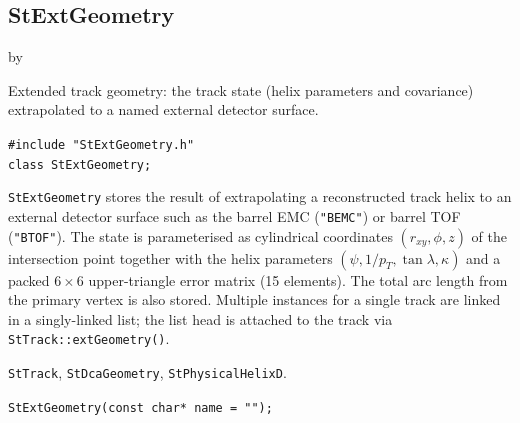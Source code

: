 \documentclass[twoside]{article}
\newcommand{\entrylabel}[1]{\mbox{\textbf{{#1}}}\hfil}%
\newenvironment{entry}
{\begin{list}{}%
    {\renewcommand{\makelabel}{\entrylabel}%
     \setlength{\labelwidth}{90pt}%
     \setlength{\leftmargin}{\labelwidth}
     \advance\leftmargin by \labelsep%
      }%
    }%
  {\end{list}}
\newcommand{\Entrylabel}[1]%
{\raisebox{0pt}[1ex][0pt]{\makebox[\labelwidth][l]%
    {\parbox[t]{\labelwidth}{\hspace{0pt}\textbf{{#1}}}}}}
\newenvironment{Entry}%
{\renewcommand{\entrylabel}{\Entrylabel}\begin{entry}}%
  {\end{entry}}
\begin{document}
\subsection{StExtGeometry}
\label{sec:StExtGeometry}
\begin{Entry}
\item[Summary]
    Extended track geometry: the track state (helix parameters and covariance)
    extrapolated to a named external detector surface.

\item[Synopsis]
    \verb+#include "StExtGeometry.h"+\\
    \verb+class StExtGeometry;+\\

\item[Description]
    \texttt{StExtGeometry} stores the result of extrapolating a reconstructed
    track helix to an external detector surface such as the barrel EMC (\verb+"BEMC"+)
    or barrel TOF (\verb+"BTOF"+).  The state is parameterised as cylindrical
    coordinates $(r_{xy}, \phi, z)$ of the intersection point together with the
    helix parameters $(\psi, 1/p_T, \tan\lambda, \kappa)$ and a packed
    $6\times6$ upper-triangle error matrix (15 elements).  The total arc length
    from the primary vertex is also stored.  Multiple instances for a single track
    are linked in a singly-linked list; the list head is attached to the track via
    \texttt{StTrack::extGeometry()}.

\item[Related Classes]
    \texttt{StTrack}, \texttt{StDcaGeometry}, \texttt{StPhysicalHelixD}.

\item[Public\\ Constructors]
    \verb+StExtGeometry(const char* name = "");+\\


\end{Entry}
\end{document}
